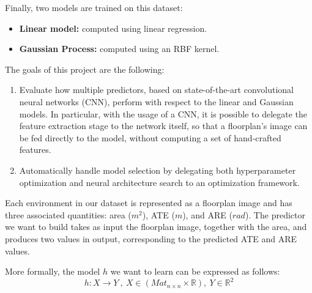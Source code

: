 \noindent
Finally, two models are trained on this dataset:
\begin{itemize}
    \item \textbf{Linear model:} computed using linear regression.
    \item \textbf{Gaussian Process:} computed using an RBF kernel.\\
\end{itemize}
\noindent
The goals of this project are the following:
\begin{enumerate}
    \item Evaluate how multiple predictors, based on state-of-the-art convolutional neural networks (CNN), perform with respect to the linear and Gaussian models. In particular, with the usage of a CNN, it is possible to delegate the feature extraction stage to the network itself, so that a floorplan's image can be fed directly to the model, without computing a set of hand-crafted features.
    \item Automatically handle model selection by delegating both hyperparameter optimization and neural architecture search to an optimization framework.
\end{enumerate}


\noindent
Each environment in our dataset is represented as a floorplan image and has three associated quantities: area ($m^2$), ATE ($m$), and ARE ($rad$). The predictor we want to build takes as input the floorplan image, together with the area, and produces two values in output, corresponding to the predicted ATE and ARE values.

\noindent
More formally, the model $h$ we want to learn can be expressed as follows:
$$
    h: X \rightarrow Y\ ,\ X\in (Mat_{n \times n}\times\mathbb{R}),\ Y\in\mathbb{R}^2 
$$